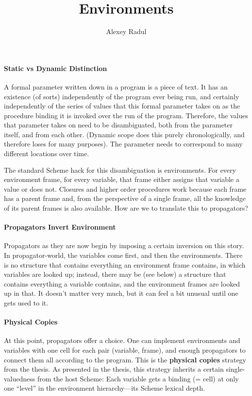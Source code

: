 \documentclass{article}
\title{Environments}
\author{Alexey Radul}
\newcommand{\defn}[1]{{\bfseries{#1}}}
\begin{document}
\maketitle

\paragraph{Static vs Dynamic Distinction}
A formal parameter written down in a program is a piece of text.
It has an existence (of sorts) independently of the program ever
being run, and certainly independently of the series of values
that this formal parameter takes on as the procedure binding it is
invoked over the run of the program.  Therefore, the values that
parameter takes on need to be disambiguated, both from the
parameter itself, and from each other.  (Dynamic scope does this
purely chronologically, and therefore loses for many purposes).
The parameter needs to correspond to many different locations over
time.

The standard Scheme hack for this disambiguation is environments.
For every environment frame, for every variable, that frame either
assigns that variable a value or does not.  Closures and higher
order procedures work because each frame has a parent frame and,
from the perspective of a single frame, all the knowledge of its
parent frames is also available.  How are we to translate this to
propagators?

\paragraph{Propagators Invert Environment}
Propagators as they are now begin by imposing a certain inversion
on this story.  In propagator-world, the variables come first, and
then the environments.  There is no structure that contains
everything an environment frame contains, in which variables are
looked up; instead, there may be (see below) a structure that
contains everything a variable contains, and the environment
frames are looked up in that.  It doesn't matter very much, but it
can feel a bit unusual until one gets used to it.

\paragraph{Physical Copies}
At this point, propagators offer a choice.  One can implement
environments and variables with one cell for each pair (variable,
frame), and enough propagators to connect them all according to
the program.  This is the \defn{physical copies} strategy from the
thesis.  As presented in the thesis, this strategy inherits a
certain single-valuedness from the host Scheme: Each variable gets
a binding (= cell) at only one ``level'' in the environment
hierarchy---its Scheme lexical depth.
\end{document}
